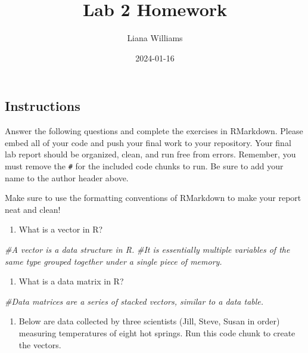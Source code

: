 \documentclass[
]{article}
\title{Lab 2 Homework}
\author{Liana Williams}
\date{2024-01-16}
\newenvironment{Shaded}{\begin{snugshade}}{\end{snugshade}}
\newcommand{\CommentTok}[1]{\textcolor[rgb]{0.56,0.35,0.01}{\textit{#1}}}
\providecommand{\tightlist}{%
  \setlength{\itemsep}{0pt}\setlength{\parskip}{0pt}}
\begin{document}
\maketitle

\hypertarget{instructions}{%
\subsection{Instructions}\label{instructions}}

Answer the following questions and complete the exercises in RMarkdown.
Please embed all of your code and push your final work to your
repository. Your final lab report should be organized, clean, and run
free from errors. Remember, you must remove the \texttt{\#} for the
included code chunks to run. Be sure to add your name to the author
header above.

Make sure to use the formatting conventions of RMarkdown to make your
report neat and clean!

\begin{enumerate}
\def\labelenumi{\arabic{enumi}.}
\tightlist
\item
  What is a vector in R?
\end{enumerate}

\begin{Shaded}
\begin{Highlighting}[]
\CommentTok{\#A vector is a data structure in R.  }
\CommentTok{\#It is essentially multiple variables of the same type grouped together under a single piece of memory. }
\end{Highlighting}
\end{Shaded}

\begin{enumerate}
\def\labelenumi{\arabic{enumi}.}
\setcounter{enumi}{1}
\tightlist
\item
  What is a data matrix in R?
\end{enumerate}

\begin{Shaded}
\begin{Highlighting}[]
\CommentTok{\#Data matrices are a series of stacked vectors, similar to a data table.}
\end{Highlighting}
\end{Shaded}

\begin{enumerate}
\def\labelenumi{\arabic{enumi}.}
\setcounter{enumi}{2}
\tightlist
\item
  Below are data collected by three scientists (Jill, Steve, Susan in
  order) measuring temperatures of eight hot springs. Run this code
  chunk to create the vectors.
\end{enumerate}
\end{document}
